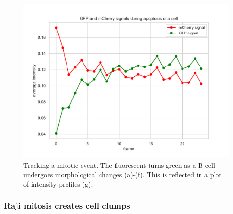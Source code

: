\begin{figure}[htb]
\centering
  \includegraphics[width=\linewidth]{img/dying_cell.pdf}
  \caption{Tracking a mitotic event. The fluorescent turns green as a B cell undergoes morphological changes (a)-(f). This is reflected in a plot of intensity profiles (g).}
\label{fig:dying_cell_series}
\end{figure}


\subsubsection{Raji mitosis creates cell clumps}

